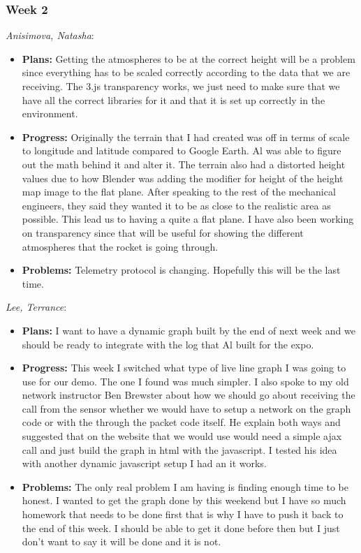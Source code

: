 \documentclass[10pt,draftclsnofoot,onecolumn]{IEEEtran}
\newcommand{\subsubsubsection}[1]{
	\hfill\break\textit{#1}:
}
\begin{document}
\subsubsection{Week 2}
\subsubsubsection{Anisimova, Natasha}
\begin{itemize}
	\item \textbf{Plans: }Getting the atmospheres to be at the correct height will be a problem since everything has to be scaled correctly according to the data that we are receiving. The 3.js transparency works, we just need to make sure that we have all the correct libraries for it and that it is set up correctly in the environment.
	\item \textbf{Progress:} Originally the terrain that I had created was off in terms of scale to longitude and latitude compared to Google Earth. Al was able to figure out the math behind it and alter it. The terrain also had a distorted height values due to how Blender was adding the modifier for height of the height map image to the flat plane. After speaking to the rest of the mechanical engineers, they said they wanted it to be as close to the realistic area as possible. This lead us to having a quite a flat plane. I have also been working on transparency since that will be useful for showing the different atmospheres that the rocket is going through.
	\item \textbf{Problems: }
	Telemetry protocol is changing. Hopefully this will be the last time.


\end{itemize}

\subsubsubsection{Lee, Terrance}
\begin{itemize}
	\item \textbf{Plans: }
	I want to have a dynamic graph built by the end of next week and we should be ready to integrate with the log that Al built for the expo.
	\item \textbf{Progress:  }
	This week I switched what type of live line graph I was going to use for our demo. The one I found was much simpler. I also spoke to my old network instructor Ben Brewster about how we should go about receiving the call from the sensor whether we would have to setup a network on the graph code or with the through the packet code itself. He explain both ways and suggested that on the website that we would use would need a simple ajax call and just build the graph in html with the javascript. I tested his idea with another dynamic javascript setup I had an it works.
	\item \textbf{Problems: }
	The only real problem I am having is finding enough time to be honest. I wanted to get the graph done by this weekend but I have so much homework that needs to be done first that is why I have to push it back to the end of this week. I should be able to get it done before then but I just don't want to say it will be done and it is not.
\end{itemize}
\end{document}

